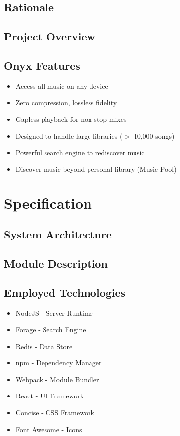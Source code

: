 \documentclass[12pt, a4paper, oneside]{article}
\newcommand{\env}[2]{\begin{#1}#2\end{#1}}
\begin{document}
\subsection{Rationale}
\subsection{Project Overview}
\subsection{Onyx Features}
\env{itemize}{
\item Access all music on any device
\item Zero compression, lossless fidelity
\item Gapless playback for non-stop mixes
\item Designed to handle large libraries ($>$ 10,000 songs)
\item Powerful search engine to rediscover music
\item Discover music beyond personal library (Music Pool)
}

\section{Specification}
\subsection{System Architecture}
\subsection{Module Description}
\subsection{Employed Technologies}
\env{itemize}{
\item NodeJS - Server Runtime
\item Forage - Search Engine
\item Redis - Data Store
\item npm - Dependency Manager
\item Webpack - Module Bundler
\item React - UI Framework
\item Concise - CSS Framework
\item Font Awesome - Icons
}
\end{document}
